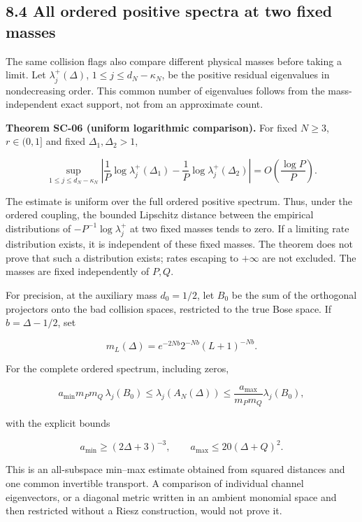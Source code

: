 \hypertarget{all-ordered-positive-spectra-at-two-fixed-masses}{%
\subsection{8.4 All ordered positive spectra at two fixed masses}\label{all-ordered-positive-spectra-at-two-fixed-masses}}

The same collision flags also compare different physical masses before taking a limit. Let \(\lambda_j^+(\Delta)\), \(1\leq j\leq d_N-\kappa_N\), be the positive residual eigenvalues in nondecreasing order. This common number of eigenvalues follows from the mass-independent exact support, not from an approximate count.

\textbf{Theorem SC-06 (uniform logarithmic comparison).} For fixed \(N\geq3\), \(r\in(0,1]\) and fixed \(\Delta_1,\Delta_2>1\),

\[
\sup_{1\leq j\leq d_N-\kappa_N}
\left|\frac1P\log\lambda_j^+(\Delta_1)
-\frac1P\log\lambda_j^+(\Delta_2)\right|
=O\!\left(\frac{\log P}{P}\right).
\]

The estimate is uniform over the full ordered positive spectrum. Thus, under the ordered coupling, the bounded Lipschitz distance between the empirical distributions of \(-P^{-1}\log\lambda_j^+\) at two fixed masses tends to zero. If a limiting rate distribution exists, it is independent of these fixed masses. The theorem does not prove that such a distribution exists; rates escaping to \(+\infty\) are not excluded. The masses are fixed independently of \(P,Q\).

For precision, at the auxiliary mass \(d_0=1/2\), let \(B_0\) be the sum of the orthogonal projectors onto the bad collision spaces, restricted to the true Bose space. If \(b=\Delta-1/2\), set

\[
m_L(\Delta)=e^{-2Nb}2^{-Nb}(L+1)^{-Nb}.
\]

For the complete ordered spectrum, including zeros,

\[
a_{\min}m_Pm_Q\,\lambda_j(B_0)
\leq\lambda_j(A_N(\Delta))
\leq\frac{a_{\max}}{m_Pm_Q}\lambda_j(B_0),
\]

with the explicit bounds

\[
a_{\min}\geq(2\Delta+3)^{-3},\qquad
a_{\max}\leq20(\Delta+Q)^2.
\]

This is an all-subspace min--max estimate obtained from squared distances and one common invertible transport. A comparison of individual channel eigenvectors, or a diagonal metric written in an ambient monomial space and then restricted without a Riesz construction, would not prove it.

